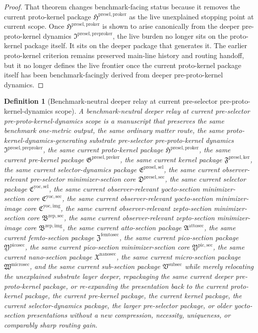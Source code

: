 \documentclass[11pt]{article}
\newcommand{\PreProtoKernelPackage}{\mathfrak I^{\mathrm{presel,preproker}}}
\newcommand{\ProtoKernelPackage}{\mathfrak H^{\mathrm{presel,proker}}}
\newcommand{\PreKernelPackage}{\mathfrak G^{\mathrm{presel,preker}}}
\newcommand{\KernelPackage}{\mathfrak F^{\mathrm{presel,ker}}}
\newcommand{\PreSectionSelectorPackage}{\mathfrak E^{\mathrm{presel,sel}}}
\newcommand{\PreSelectorMinSectionCore}{\mathfrak D^{\mathrm{presel,sec}}}
\newcommand{\YoctoSelectorPackage}{\mathfrak C^{\mathrm{yoc,sel}}}
\newcommand{\YoctoImageCore}{\mathfrak C^{\mathrm{yoc,img}}}
\newcommand{\YoctoMinSectionCore}{\mathfrak C^{\mathrm{yoc,sec}}}
\newcommand{\ZeptoImageCore}{\mathfrak B^{\mathrm{zep,img}}}
\newcommand{\ZeptoMinSectionCore}{\mathfrak B^{\mathrm{zep,sec}}}
\newcommand{\AttoSectionPackage}{\mathfrak A^{\mathrm{attosec}}}
\newcommand{\FemtoSectionPackage}{\mathfrak Z^{\mathrm{femtosec}}}
\newcommand{\PicoSectionPackage}{\mathfrak Y^{\mathrm{picosec}}}
\newcommand{\PicoMinSectionCore}{\mathfrak Y^{\mathrm{pic,sec}}}
\newcommand{\NanoSectionPackage}{\mathfrak X^{\mathrm{nanosec}}}
\newcommand{\MicroSectionPackage}{\mathfrak W^{\mathrm{microsec}}}
\newcommand{\SubSectionPackage}{\mathfrak V^{\mathrm{subsec}}}
\newtheorem{definition}{Definition}
\begin{document}
\begin{proof}
That theorem changes benchmark-facing status because it removes the current proto-kernel package \(\ProtoKernelPackage\) as the live unexplained stopping point at current scope. Once \(\ProtoKernelPackage\) is shown to arise canonically from the deeper pre-proto-kernel dynamics \(\PreProtoKernelPackage\), the live burden no longer sits on the proto-kernel package itself. It sits on the deeper package that generates it. The earlier proto-kernel criterion remains preserved main-line history and routing handoff, but it no longer defines the live frontier once the current proto-kernel package itself has been benchmark-facingly derived from deeper pre-proto-kernel dynamics.
\end{proof}

\begin{definition}[Benchmark-neutral deeper relay at current pre-selector pre-proto-kernel-dynamics scope]
A \emph{benchmark-neutral deeper relay at current pre-selector pre-proto-kernel-dynamics scope} is a manuscript that preserves the same benchmark one-metric output, the same ordinary matter route, the same proto-kernel-dynamics-generating substrate pre-selector pre-proto-kernel dynamics \(\PreProtoKernelPackage\), the same current proto-kernel package \(\ProtoKernelPackage\), the same current pre-kernel package \(\PreKernelPackage\), the same current kernel package \(\KernelPackage\), the same current selector-dynamics package \(\PreSectionSelectorPackage\), the same current observer-relevant pre-selector minimizer-section core \(\PreSelectorMinSectionCore\), the same current selector package \(\YoctoSelectorPackage\), the same current observer-relevant yocto-section minimizer-section core \(\YoctoMinSectionCore\), the same current observer-relevant yocto-section minimizer-image core \(\YoctoImageCore\), the same current observer-relevant zepto-section minimizer-section core \(\ZeptoMinSectionCore\), the same current observer-relevant zepto-section minimizer-image core \(\ZeptoImageCore\), the same current atto-section package \(\AttoSectionPackage\), the same current femto-section package \(\FemtoSectionPackage\), the same current pico-section package \(\PicoSectionPackage\), the same current pico-section minimizer-section core \(\PicoMinSectionCore\), the same current nano-section package \(\NanoSectionPackage\), the same current micro-section package \(\MicroSectionPackage\), and the same current sub-section package \(\SubSectionPackage\) while merely relocating the unexplained substrate layer deeper, repackaging the same current deeper pre-proto-kernel package, or re-expanding the presentation back to the current proto-kernel package, the current pre-kernel package, the current kernel package, the current selector-dynamics package, the larger pre-selector package, or older yocto-section presentations without a new compression, necessity, uniqueness, or comparably sharp routing gain.
\end{definition}
\end{document}

